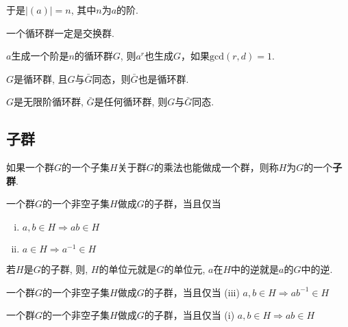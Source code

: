 \begin{Note}
于是$|(a)| = n$, 其中$n$为$a$的阶.
\end{Note}

\begin{Proposition}
一个循环群一定是交换群.
\end{Proposition}

\begin{Proposition}
$a$生成一个阶是$n$的循环群$G$, 则$a^r$也生成$G$，如果$\text{gcd}(r, d) = 1$.
\end{Proposition}

\begin{Proposition}
$G$是循环群, 且$G$与$\bar{G}$同态，则$\bar{G}$也是循环群.
\end{Proposition}

\begin{Proposition}
$G$是无限阶循环群, $\bar{G}$是任何循环群, 则$G$与$\bar{G}$同态.
\end{Proposition}

\subsection{子群}

\begin{Definition}[子群]
如果一个群$G$的一个子集$H$关于群$G$的乘法也能做成一个群，则称$H$为$G$的一个\textbf{子群}.
\end{Definition}

\begin{Theorem}
一个群$G$的一个非空子集$H$做成$G$的子群，当且仅当
\begin{enumerate}[(i)]
\item $a, b \in H \Rightarrow ab \in H$
\item $a \in H \Rightarrow a^{-1} \in H$
\end{enumerate}
\end{Theorem}

\begin{Corollary}
若$H$是$G$的子群, 则, $H$的单位元就是$G$的单位元, $a$在$H$中的逆就是$a$的$G$中的逆.
\end{Corollary}

\begin{Theorem}
一个群$G$的一个非空子集$H$做成$G$的子群，当且仅当 (iii) $a, b \in H \Rightarrow ab^{-1} \in H$
\end{Theorem}

\begin{Theorem}
一个群$G$的一个非空\;\;子集$H$做成$G$的子群，当且仅当 (i) $a, b \in H \Rightarrow ab \in H$
\end{Theorem}

